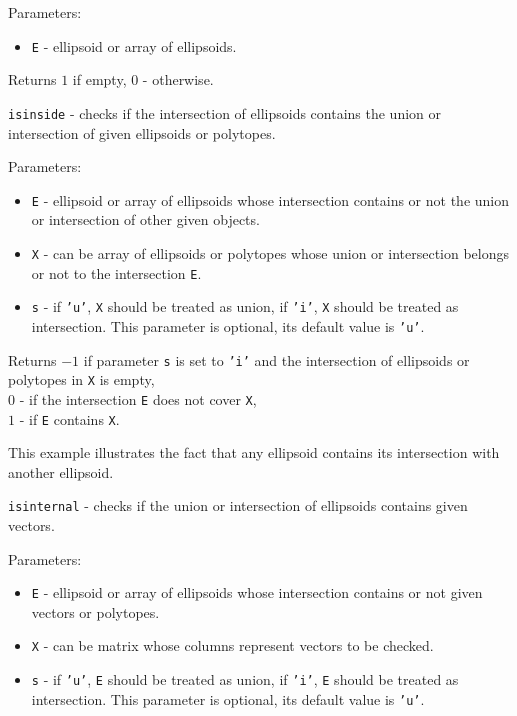 \documentclass{report}
\begin{document}
Parameters:
\begin{itemize}
\item {\tt E} - ellipsoid or array of ellipsoids.
\end{itemize}

Returns $1$ if empty, $0$ - otherwise.

\newpage

{\Large {\tt isinside}} - checks if the intersection of ellipsoids contains
the union or intersection of given ellipsoids or polytopes.

Parameters:
\begin{itemize}
\item {\tt E} - ellipsoid or array of ellipsoids whose intersection contains
or not the union or intersection of other given objects.
\item {\tt X} - can be array of ellipsoids or polytopes whose union or
intersection belongs or not to the intersection {\tt E}.
\item {\tt s} - if {\tt 'u'}, {\tt X} should be treated as union,
if {\tt 'i'}, {\tt X} should be treated as intersection. This parameter
is optional, its default value is {\tt 'u'}.
\end{itemize}

Returns $-1$ if parameter {\tt s} is set to {\tt 'i'} and the intersection
of ellipsoids or polytopes in {\tt X} is empty,\\
$0$ - if the intersection {\tt E} does not cover {\tt X},\\
$1$ - if {\tt E} contains {\tt X}.


This example illustrates the fact that any ellipsoid contains its intersection with
another ellipsoid.

\newpage

{\Large {\tt isinternal}} - checks if the union or intersection of ellipsoids
contains given vectors.

Parameters:
\begin{itemize}
\item {\tt E} - ellipsoid or array of ellipsoids whose intersection contains
or not given vectors or polytopes.
\item {\tt X} - can be matrix whose columns represent vectors to be checked.
\item {\tt s} - if {\tt 'u'}, {\tt E} should be treated as union,
if {\tt 'i'}, {\tt E} should be treated as intersection. This parameter
is optional, its default value is {\tt 'u'}.
\end{itemize}
\end{document}
